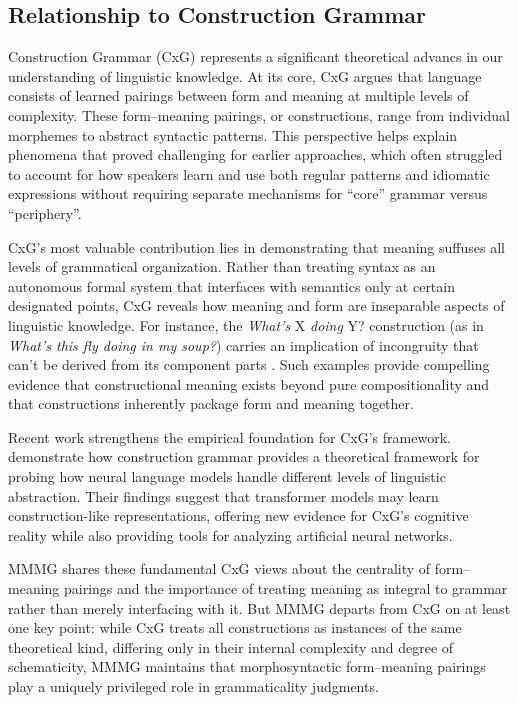 \documentclass[12pt,letterpaper]{article}
\begin{document}
\subsection{Relationship to Construction Grammar}

Construction Grammar (CxG) \autocite{fillmore1988mechanisms, kay1999grammatical,  goldberg1995constructions, goldberg2019, sag2012sign} represents a significant theoretical advancs in our understanding of linguistic knowledge. At its core, CxG argues that language consists of learned pairings between form and meaning at multiple levels of complexity. These form--meaning pairings, or constructions, range from individual morphemes to abstract syntactic patterns. This perspective helps explain phenomena that proved challenging for earlier approaches, which often struggled to account for how speakers learn and use both regular patterns and idiomatic expressions without requiring separate mechanisms for ``core'' grammar versus ``periphery''.

CxG's most valuable contribution lies in demonstrating that meaning suffuses all levels of grammatical organization. Rather than treating syntax as an autonomous formal system that interfaces with semantics only at certain designated points, CxG reveals how meaning and form are inseparable aspects of linguistic knowledge. For instance, the \textit{What's} X \textit{doing} Y? construction (as in \textit{What's this fly doing in my soup?}) carries an implication of incongruity that can't be derived from its component parts \autocite{kay1999grammatical}. Such examples provide compelling evidence that constructional meaning exists beyond pure compositionality and that constructions inherently package form and meaning together.

Recent work strengthens the empirical foundation for CxG's framework. \textcite{weissweiler2023construction} demonstrate how construction grammar provides a theoretical framework for probing how neural language models handle different levels of linguistic abstraction. Their findings suggest that transformer models may learn construction-like representations, offering new evidence for CxG's cognitive reality while also providing tools for analyzing artificial neural networks.

MMMG shares these fundamental CxG views about the centrality of form--meaning pairings and the importance of treating meaning as integral to grammar rather than merely interfacing with it. But MMMG departs from CxG on at least one key point: while CxG treats all constructions as instances of the same theoretical kind, differing only in their internal complexity and degree of schematicity, MMMG maintains that morphosyntactic form--meaning pairings play a uniquely privileged role in grammaticality judgments.
\end{document}
